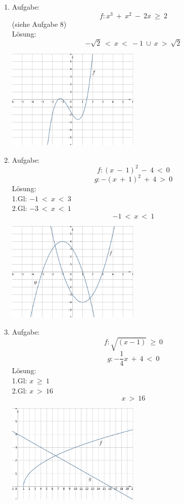 \begin{enumerate}
	\item Aufgabe:
					\[f : x^3 \ + \ x^2 \ - \ 2x \ \geq \ 2\]
					(siehe Aufgabe 8) \\
				L\"osung:
					\[ - \sqrt 2 \ < \ x \ < \ -1 \ \cup \ x \ > \ \sqrt 2\]
					\begin{center}
						\includegraphics[width=0.5\textwidth]{img/Aufgaben/Analytisch/A13.PNG}
					\end{center}
	\item Aufgabe:
					\[f : (x \ - \ 1)^2 \ - \ 4 \ < \ 0\]
					\[g : -(x \ + \ 1)^2 \ + \ 4 \ > \ 0\]
				L\"osung: \\
					1.Gl: $ -1 \ < \ x \ < \ 3 $ \\
					2.Gl: $ -3 \ < \ x \ < \ 1 $ \\
					\[-1 \ < \ x \ < \ 1\]
					\begin{center}
						\includegraphics[width=0.5\textwidth]{img/Aufgaben/Analytisch/A14.PNG}
					\end{center}
	\item Aufgabe:
					\[f : \sqrt {(x-1)} \ \geq \ 0\]
					\[g : - \frac 1 4 x \ + \ 4 \ < \ 0\]
				L\"osung: \\
					1.Gl: $ x \ \geq \ 1 $ \\
					2.Gl: $ x \ > \ 16 $
					\[ x \ > \ 16\]
					\begin{center}
						\includegraphics[width=0.5\textwidth]{img/Aufgaben/Analytisch/A15.PNG}

\end{center}
\end{enumerate}

